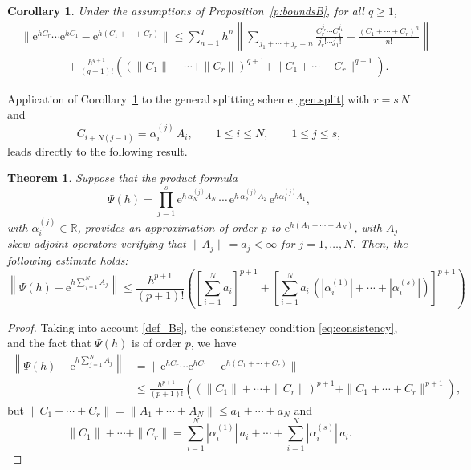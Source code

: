 \documentclass[11pt]{article}
\newcommand{\e}{\ensuremath{\mathrm{e}}}
\newtheorem{theorem}[lemma]{Theorem}
\newtheorem{corollary}[lemma]{Corollary}
\begin{document}
\begin{corollary}
\label{c:expB_le}
Under the assumptions of Proposition~\ref{p:boundsB}, for all $q\geq 1$,
\begin{align*}
 & \|\mathrm{e}^{h C_r} \cdots \mathrm{e}^{h C_1} - \mathrm{e}^{h (C_1+\cdots + C_r)}\| \leq 
 \sum_{n=1}^{q} h^n \left\| \sum_{j_1+\cdots+j_r = n} \frac{C_r^{j_r} \cdots C_1^{j_1}}{j_r! \cdots j_1!} 
 - \frac{(C_1+\cdots+C_r)^n}{n!} \right\| \\
 & \qquad\qquad  + \frac{h^{q+1}}{(q+1)!} \left( ( \|C_1\|+\cdots + \|C_r\|)^{q+1} + \|C_1+\cdots + C_r\|^{q+1} \right).
\end{align*}
\end{corollary}
Application of Corollary~\ref{c:expB_le} to the general splitting scheme \eqref{gen.split} with $r=s\, N$ and
\begin{equation} \label{def_Bs}
C_{i + N (j-1)} = \alpha_i^{(j)} \, A_i, \qquad 1\leq i \leq N, \qquad 1\leq j \leq s,
\end{equation}
leads directly to the following result.

\begin{theorem} 
\label{th_gen.split}
Suppose that the product formula 
\[
    \Psi(h) = \prod_{j=1}^s \e^{h \, \alpha_N^{(j)} A_N} \, \cdots \, \e^{h \, \alpha_2^{(j)} A_2}  \, \e^{h \alpha_1^{(j)} A_1},
\]
with $\alpha_i^{(j)} \in \mathbb{R}$, provides an approximation of order $p$ to $\e^{h(A_1 + \cdots + A_N)}$,
with $A_j$ skew-adjoint operators verifying that $\|A_j\| =  a_j < \infty$ for $j=1,\ldots, N$. Then, the following estimate holds:
\begin{equation*}
  \left\|\Psi(h)-\e^{h \sum_{j=1}^N A_j} \right\| \leq \frac{h^{p+1}}{(p+1)!} \left( \left[\sum_{i=1}^N a_i \right]^{p+1} + \left[ \sum_{i=1}^N a_i \, \left(|\alpha_i^{(1)}|+\cdots+|\alpha_i^{(s)}|\right)\right]^{p+1} \right)
  \end{equation*}
\end{theorem}
\begin{proof}
Taking into account \eqref{def_Bs}, the consistency condition \eqref{eq:consistency}, and the fact that $\Psi(h)$ is of order $p$, we have 
\[
\begin{aligned}
   \left\|\Psi(h)-\e^{h \sum_{j=1}^N A_j} \right\| & = \|\mathrm{e}^{h C_r} \cdots \mathrm{e}^{h C_1} - \mathrm{e}^{h (C_1+\cdots + C_r)}\| \\
   & \le
   \frac{h^{p+1}}{(p+1)!} \left( ( \|C_1\|+\cdots + \|C_r\|)^{p+1} + \|C_1+\cdots + C_r\|^{p+1} \right),
\end{aligned}   
\]   
but $\|C_1+\cdots + C_r\| = \|A_1+\cdots + A_N\| \le a_1 + \cdots + a_N$ and
\[
  \|C_1\|+\cdots + \|C_r\| = \sum_{i=1}^N  |\alpha_i^{(1)}| \, a_i + \cdots + \sum_{i=1}^N  |\alpha_i^{(s)}| \, a_i.
\]  
\end{proof}
\end{document}
